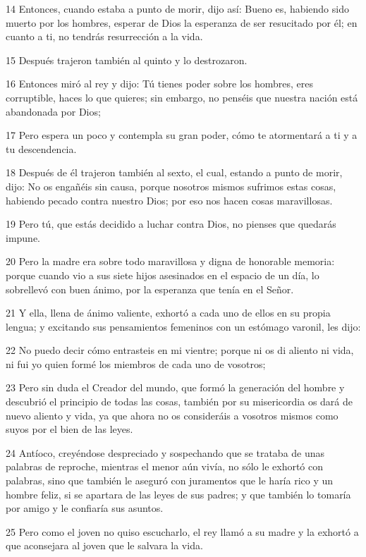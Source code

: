 \par 14 Entonces, cuando estaba a punto de morir, dijo así: Bueno es, habiendo sido muerto por los hombres, esperar de Dios la esperanza de ser resucitado por él; en cuanto a ti, no tendrás resurrección a la vida.
\par 15 Después trajeron también al quinto y lo destrozaron.
\par 16 Entonces miró al rey y dijo: Tú tienes poder sobre los hombres, eres corruptible, haces lo que quieres; sin embargo, no penséis que nuestra nación está abandonada por Dios;
\par 17 Pero espera un poco y contempla su gran poder, cómo te atormentará a ti y a tu descendencia.
\par 18 Después de él trajeron también al sexto, el cual, estando a punto de morir, dijo: No os engañéis sin causa, porque nosotros mismos sufrimos estas cosas, habiendo pecado contra nuestro Dios; por eso nos hacen cosas maravillosas.
\par 19 Pero tú, que estás decidido a luchar contra Dios, no pienses que quedarás impune.
\par 20 Pero la madre era sobre todo maravillosa y digna de honorable memoria: porque cuando vio a sus siete hijos asesinados en el espacio de un día, lo sobrellevó con buen ánimo, por la esperanza que tenía en el Señor.
\par 21 Y ella, llena de ánimo valiente, exhortó a cada uno de ellos en su propia lengua; y excitando sus pensamientos femeninos con un estómago varonil, les dijo:
\par 22 No puedo decir cómo entrasteis en mi vientre; porque ni os di aliento ni vida, ni fui yo quien formé los miembros de cada uno de vosotros;
\par 23 Pero sin duda el Creador del mundo, que formó la generación del hombre y descubrió el principio de todas las cosas, también por su misericordia os dará de nuevo aliento y vida, ya que ahora no os consideráis a vosotros mismos como suyos por el bien de las leyes.
\par 24 Antíoco, creyéndose despreciado y sospechando que se trataba de unas palabras de reproche, mientras el menor aún vivía, no sólo le exhortó con palabras, sino que también le aseguró con juramentos que le haría rico y un hombre feliz, si se apartara de las leyes de sus padres; y que también lo tomaría por amigo y le confiaría sus asuntos.
\par 25 Pero como el joven no quiso escucharlo, el rey llamó a su madre y la exhortó a que aconsejara al joven que le salvara la vida.
